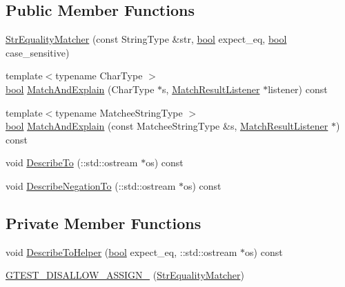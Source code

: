 \subsection*{Public Member Functions}
\begin{DoxyCompactItemize}
\item 
\hyperlink{classtesting_1_1internal_1_1StrEqualityMatcher_a613006d82018b18ef8fded721f70f860}{Str\+Equality\+Matcher} (const String\+Type \&str, \hyperlink{classbool}{bool} expect\+\_\+eq, \hyperlink{classbool}{bool} case\+\_\+sensitive)
\item 
{\footnotesize template$<$typename Char\+Type $>$ }\\\hyperlink{classbool}{bool} \hyperlink{classtesting_1_1internal_1_1StrEqualityMatcher_a72b8373d619e29ce27ed3ecdc6089b0b}{Match\+And\+Explain} (Char\+Type $\ast$s, \hyperlink{classtesting_1_1MatchResultListener}{Match\+Result\+Listener} $\ast$listener) const
\item 
{\footnotesize template$<$typename Matchee\+String\+Type $>$ }\\\hyperlink{classbool}{bool} \hyperlink{classtesting_1_1internal_1_1StrEqualityMatcher_aedb1ac6fc8c15b318dfd8e99927aa2e1}{Match\+And\+Explain} (const Matchee\+String\+Type \&s, \hyperlink{classtesting_1_1MatchResultListener}{Match\+Result\+Listener} $\ast$) const
\item 
void \hyperlink{classtesting_1_1internal_1_1StrEqualityMatcher_a18c05a02da6b1df1c3dbfe4870aaa3c2}{Describe\+To} (\+::std\+::ostream $\ast$os) const
\item 
void \hyperlink{classtesting_1_1internal_1_1StrEqualityMatcher_af595c0c79e9e550496fe62bc6bbdd4f3}{Describe\+Negation\+To} (\+::std\+::ostream $\ast$os) const
\end{DoxyCompactItemize}
\subsection*{Private Member Functions}
\begin{DoxyCompactItemize}
\item 
void \hyperlink{classtesting_1_1internal_1_1StrEqualityMatcher_accddf33055803fee7ff0ef7988204474}{Describe\+To\+Helper} (\hyperlink{classbool}{bool} expect\+\_\+eq, \+::std\+::ostream $\ast$os) const
\item 
\hyperlink{classtesting_1_1internal_1_1StrEqualityMatcher_a6d3c1bff5de614e105f93c5d05d49a80}{G\+T\+E\+S\+T\+\_\+\+D\+I\+S\+A\+L\+L\+O\+W\+\_\+\+A\+S\+S\+I\+G\+N\+\_\+} (\hyperlink{classtesting_1_1internal_1_1StrEqualityMatcher}{Str\+Equality\+Matcher})
\end{DoxyCompactItemize}
